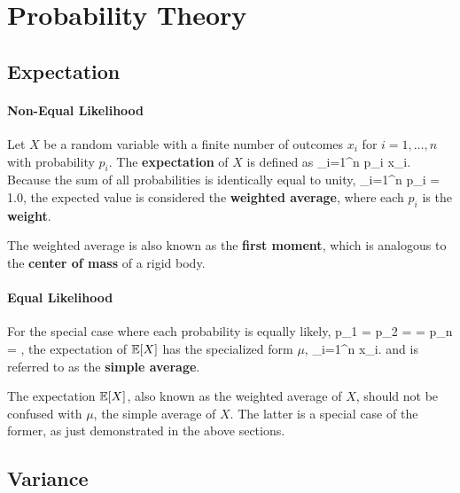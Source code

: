 \chapter{Probability Theory}

\section{Expectation}

\subsubsection{Non-Equal Likelihood}

Let $X$ be a random variable with a finite number of outcomes $x_i$
for $i=1,\ldots,n$ with probability $p_i$.  The {\bf expectation} 
of $X$ is defined as
\be
\ex {} \sum_{i=1}^n p_i \; x_i.
\ee
Because the sum of all probabilities is identically equal to unity,
\be
\sum_{i=1}^n p_i = 1.0,
\ee
the expected
value is considered the {\bf weighted average}, where each $p_i$ is the 
{\bf weight}.

\begin{Hremark}
The weighted average is also known as the {\bf first moment}, which is 
analogous to the {\bf center of mass} of a rigid body.
\end{Hremark}

\subsubsection{Equal Likelihood}
For the special case where each probability is equally likely, 
\be
p_1 = p_2 = \cdots = p_n = ,
\label{eq:equal_probability}
\ee
the expectation of $\mathbb{E}[X]$ has the specialized form $\mu$,
\be
\mu {} \ex \overset{(\ref{eq:equal_probability})}{=} 
 \sum_{i=1}^n \; x_i.
\label{eq:simple_average}
\ee
and is referred to as the {\bf simple average}.

\begin{Hremark}
The expectation $\mathbb{E}[X]$, 
also known as the weighted average of $X$, should
not be confused with $\mu$, the simple average of $X$.  
The latter is a special
case of the former, as just demonstrated in the above sections.
\end{Hremark}

\section{Variance}

